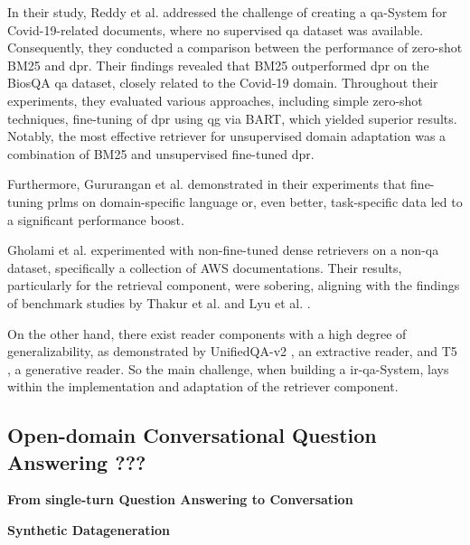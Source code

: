 In their study, Reddy et al. \cite{reddy_synthetic_2022} addressed the challenge of creating a \gls{qa}-System for Covid-19-related documents, where no supervised \gls{qa} dataset was available. Consequently, they conducted a comparison between the performance of zero-shot BM25 and \gls{dpr}. Their findings revealed that BM25 outperformed \gls{dpr} on the BiosQA \gls{qa} dataset, closely related to the Covid-19 domain. Throughout their experiments, they evaluated various approaches, including simple zero-shot techniques, fine-tuning of \gls{dpr} using \gls{qg} via BART, which yielded superior results. Notably, the most effective retriever for unsupervised domain adaptation was a combination of BM25 and unsupervised fine-tuned \gls{dpr}.

Furthermore, Gururangan et al. \cite{gururangan_dont_2020} demonstrated in their experiments that fine-tuning \glspl{prlm} on domain-specific language or, even better, task-specific data led to a significant performance boost.

Gholami et al. \cite{gholami_zero-shot_2021} experimented with non-fine-tuned dense retrievers on a non-\gls{qa} dataset, specifically a collection of AWS documentations. Their results, particularly for the retrieval component, were sobering, aligning with the findings of benchmark studies by Thakur et al. \cite{thakur_beir_2021} and Lyu et al. \cite{farea_evaluation_2022}.

On the other hand, there exist reader components with a high degree of generalizability, as demonstrated by UnifiedQA-v2 \cite{khashabi_unifiedqa-v2_2022}, an extractive reader, and T5 \cite{raffel_exploring_2023}, a generative reader. So the main challenge, when building a \gls{ir}-\gls{qa}-System, lays within the implementation and adaptation of the retriever component.


\subsection{Open-domain Conversational Question Answering ???} 
\label{subsec:related_work_cqa}

\textbf{From single-turn Question Answering to Conversation}

\textbf{Synthetic Datageneration}

